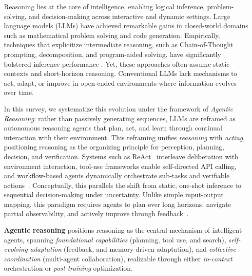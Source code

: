 Reasoning lies at the core of intelligence, enabling logical inference, problem-solving, and decision-making across interactive and dynamic settings. Large language models (LLMs) have achieved remarkable gains in closed-world domains such as mathematical problem solving and code generation. Empirically, techniques that explicitize intermediate reasoning, such as Chain-of-Thought prompting, decomposition, and program-aided solving, have significantly bolstered inference performance \cite{wei2022chain,zhou2022least,gao2023pal,yao2023tree}. Yet, these approaches often assume static contexts and short-horizon reasoning. Conventional LLMs lack mechanisms to act, adapt, or improve in open-ended environments where information evolves over time.

In this survey, we systematize this evolution under the framework of \emph{Agentic Reasoning}: rather than passively generating sequences, LLMs are reframed as autonomous reasoning agents that plan, act, and learn through continual interaction with their environment. This reframing unifies \emph{reasoning} with \emph{acting}, positioning reasoning as the organizing principle for perception, planning, decision, and verification. Systems such as ReAct~\cite{yao2023react} interleave deliberation with environment interaction, tool-use frameworks enable self-directed API calling, and workflow-based agents dynamically orchestrate sub-tasks and verifiable actions~\cite{yao2023react,schick2023toolformer,shen2023hugginggpt}. Conceptually, this parallels the shift from static, one-shot inference to sequential decision-making under uncertainty. Unlike simple input-output mapping, this paradigm requires agents to plan over long horizons, navigate partial observability, and actively improve through feedback~\cite{wang2024survey,singh2025agentic,huang2024survey}.

\begin{tcolorbox}[
  agentdef,
  float,
  floatplacement=t
]
\textbf{Agentic reasoning} positions reasoning as the central mechanism of intelligent agents, spanning \emph{foundational capabilities} (planning, tool use, and search), \emph{self-evolving adaptation} (feedback, and memory-driven adaptation), and \emph{collective coordination} (multi-agent collaboration), realizable through either \emph{in-context} orchestration or \emph{post-training} optimization.
\end{tcolorbox}


